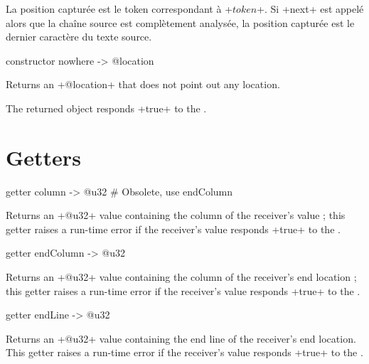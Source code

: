 La position capturée est le token correspondant à \ggsq+$token$+. Si \ggsq+next+ est appelé alors que la chaîne source est complètement analysée, la position capturée est le dernier caractère du texte source.







\begin{galgas4}
constructor nowhere -> @location
\end{galgas4}


Returns an \ggsq+@location+ that does not point out any location.

The returned object responds \ggsq+true+ to the .





\section{Getters}



\begin{galgas4}
getter column -> @u32 # Obsolete, use endColumn
\end{galgas4}

Returns an \ggsq+@u32+ value containing the column of the receiver's value ; this getter raises a run-time error if the receiver's value responds \ggsq+true+ to the .


\begin{galgas4}
getter endColumn -> @u32
\end{galgas4}

Returns an \ggsq+@u32+ value containing the column of the receiver's end location ; this getter raises a run-time error if the receiver's value responds \ggsq+true+ to the .



\begin{galgas4}
getter endLine -> @u32
\end{galgas4}

Returns an \ggsq+@u32+ value containing the end line of the receiver's end location. This getter raises a run-time error if the receiver's value responds \ggsq+true+ to the .


